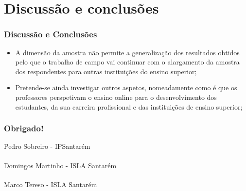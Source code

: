 \documentclass[10pt]{beamer}
\begin{document}
\section{Discussão e conclusões}
\begin{frame}
	\frametitle{Discussão e Conclusões}
	\begin{itemize}

 		\item A dimensão da amostra não permite a generalização dos resultados obtidos pelo que o trabalho de campo vai continuar com o alargamento da amostra dos respondentes para outras instituições do ensino superior;

		\item Pretende-se ainda investigar outros aspetos, nomeadamente como é que os professores perspetivam o ensino online para o desenvolvimento dos estudantes, da sua carreira profissional e das instituições de ensino superior;


	\end{itemize}
	\tiny 
\end{frame}


\begin{frame}
\frametitle{Obrigado!}
\normalsize
	Pedro Sobreiro - IPSantarém  \\~\\
	Domingos Martinho - ISLA Santarém \\~\\
	Marco Tereso - ISLA Santarém \\~\\
\end{frame}
\end{document}
